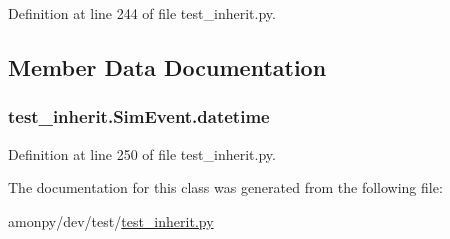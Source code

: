 Definition at line 244 of file test\-\_\-inherit.\-py.



\subsection{Member Data Documentation}
\hypertarget{classtest__inherit_1_1_sim_event_a6d566ba250cca6d17e970715706e636c}{
\subsubsection[{datetime}]{\setlength{\rightskip}{0pt plus 5cm}test\-\_\-inherit.\-Sim\-Event.\-datetime}}\label{classtest__inherit_1_1_sim_event_a6d566ba250cca6d17e970715706e636c}


Definition at line 250 of file test\-\_\-inherit.\-py.



The documentation for this class was generated from the following file\-:\begin{DoxyCompactItemize}
\item 
amonpy/dev/test/\hyperlink{test__inherit_8py}{test\-\_\-inherit.\-py}\end{DoxyCompactItemize}
